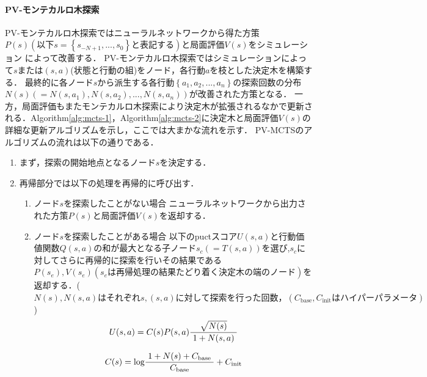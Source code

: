 \paragraph{PV-モンテカルロ木探索}
PV-モンテカルロ木探索ではニューラルネットワークから得た方策$P(s)(以下s=\left\{ s_{-N+1}, ..., s_0 \right\}と表記する)$と局面評価$V(s)$をシミュレーション
によって改善する．
PV-モンテカルロ木探索ではシミュレーションによって$s$または$(s, a)$(状態と行動の組)をノード，各行動$a$を枝とした決定木を構築する．
最終的に各ノード$s$から派生する各行動$\left\{a_1, a_2, ..., a_n\right\}$の探索回数の分布$N(s)(={N(s, a_1), N(s, a_2), ..., N(s, a_n)})$が改善された方策となる．
一方，局面評価もまたモンテカルロ木探索により決定木が拡張されるなかで更新される．Algorithm\ref{alg:mcts-1}，Algorithm\ref{alg:mcts-2}に決定木と局面評価$V(s)$の詳細な更新アルゴリズムを示し，ここでは大まかな流れを示す．
PV-MCTSのアルゴリズムの流れは以下の通りである．

\begin{enumerate}
    \item まず，探索の開始地点となるノード$s$を決定する．
    \item 再帰部分では以下の処理を再帰的に呼び出す．
    \begin{enumerate}
        \item ノード$s$を探索したことがない場合
        ニューラルネットワークから出力された方策$P(s)$と局面評価$V(s)$を返却する．
        \item ノード$s$を探索したことがある場合
        以下のpuctスコア$U(s, a)$と行動価値関数$Q(s, a)$の和が最大となる子ノード$s_c(=T(s, a))$を選び,$s_c$に対してさらに再帰的に探索を行いその結果である$P(s_e), V(s_e)(s_eは再帰処理の結果たどり着く
        決定木の端のノード)$を返却する．($N(s), N(s, a)はそれぞれs,(s, a)に対して探索を行った回数，  (C_{\textrm{base}}, C_{\textrm{init}}はハイパーパラメータ)$)
        \begin{equation}
            {U(s, a)= C(s)P(s, a)\frac{\sqrt{N(s)}}{1+N(s, a)}\\
            }
        \end{equation}
        
        \begin{equation}
            {C(s)=\textrm{log}\frac{1+N(s)+C_{\textrm{base}}}{C_{\textrm{base}}}+C_{\textrm{init}}\\
           }
        \end{equation}
    \end{enumerate}
\end{enumerate}


